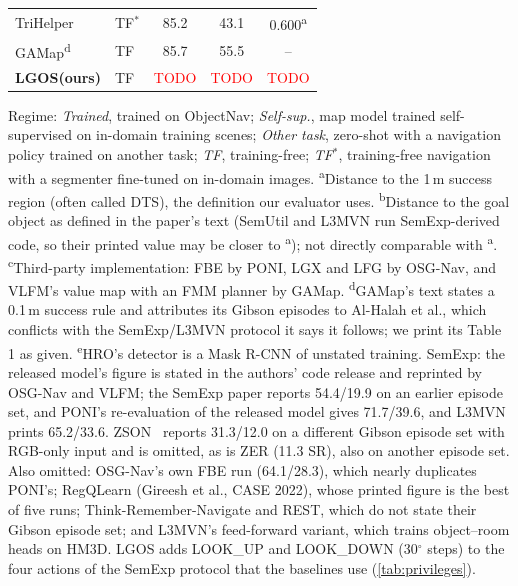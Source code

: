\documentclass[10pt]{article}
\newcommand{\tbd}{\textcolor{red}{TODO}}
\newcommand{\ours}{LGOS\xspace}
\newcommand{\SR}{\textsc{SR}\xspace}
\begin{document}
\begin{table}[t]
\begin{tabular}{@{}llccc@{}}
TriHelper~\citep{zhang2024trihelper} & TF$^{\ast}$ & 85.2 & 43.1 & 0.600\textsuperscript{a} \\
GAMap\textsuperscript{d}~\citep{yuan2024gamap} & TF & 85.7 & 55.5 & -- \\
\midrule
\textbf{\ours (ours)} & TF & \tbd & \tbd & \tbd \\
\bottomrule
\end{tabular}
\par\smallskip
\parbox{\linewidth}{\footnotesize Regime: \emph{Trained}, trained on ObjectNav; \emph{Self-sup.}, map model
trained self-supervised on in-domain training scenes; \emph{Other task}, zero-shot with a navigation policy
trained on another task; \emph{TF}, training-free; \emph{TF$^{\ast}$}, training-free navigation with a segmenter
fine-tuned on in-domain images. \textsuperscript{a}Distance to the 1\,m success region (often called DTS), the
definition our evaluator uses. \textsuperscript{b}Distance to the goal object as defined in the paper's text
(SemUtil and L3MVN run SemExp-derived code, so their printed value may be closer to \textsuperscript{a}); not
directly comparable with \textsuperscript{a}. \textsuperscript{c}Third-party implementation: FBE by PONI, LGX and
LFG by OSG-Nav, and VLFM's value map with an FMM planner by GAMap. \textsuperscript{d}GAMap's text states a 0.1\,m
success rule and attributes its Gibson episodes to Al-Halah et al., which conflicts with the SemExp/L3MVN protocol it
says it follows; we print its Table 1 as given. \textsuperscript{e}HRO's detector is a Mask R-CNN of unstated training. SemExp: the released model's figure is stated in the authors' code
release and reprinted by OSG-Nav and VLFM; the SemExp paper reports 54.4/19.9 on an earlier episode set, and PONI's
re-evaluation of the released model gives 71.7/39.6, and L3MVN prints 65.2/33.6. ZSON~\citep{majumdar2022zson} reports 31.3/12.0 on a different Gibson episode set with RGB-only input
and is omitted, as is ZER (11.3 \SR), also on another episode set. Also omitted: OSG-Nav's own FBE run (64.1/28.3), which
nearly duplicates PONI's; RegQLearn (Gireesh et al., CASE 2022), whose printed figure is the best of five runs;
Think-Remember-Navigate and REST, which do not state their Gibson episode set; and L3MVN's feed-forward variant,
which trains object--room heads on HM3D. \ours adds LOOK\_UP and LOOK\_DOWN (30$^\circ$ steps) to the four actions of
the SemExp protocol that the baselines use (\cref{tab:privileges}).}
\end{table}
\end{document}
